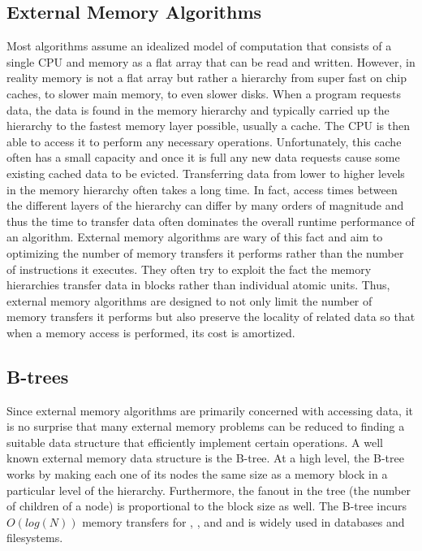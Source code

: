 \documentclass{style}
\begin{document}
\subsection{External Memory Algorithms}


Most algorithms assume an idealized model of computation that consists of a
single CPU and memory as a flat array
that can be read and written. However, in reality memory is not a flat array
but rather a hierarchy from super fast on chip caches, to slower main memory,
to even slower disks. When a program requests data, the data is found in the
memory hierarchy and typically carried up the hierarchy to the fastest memory
layer possible, usually a cache. The CPU is then able to access it to perform
any necessary operations. Unfortunately, this cache often has a small capacity
and once it is full any new data requests cause some existing cached data to
be evicted. Transferring data from lower to higher levels in the memory
hierarchy often takes a long time. In fact, access times between the different
layers of the hierarchy can differ by many orders of magnitude and thus the
time to transfer data often dominates the overall runtime performance of an
algorithm. External memory algorithms are wary of this fact and aim to
optimizing the number of memory transfers it performs rather than the number
of instructions it executes. They often try to exploit the fact the memory
hierarchies transfer data in blocks rather than individual atomic units. Thus,
external memory algorithms are designed to not only limit the number of memory
transfers it performs but also preserve the locality of related data so that
when a memory access is performed, its cost is amortized.

\subsection{B-trees}

Since external memory algorithms are primarily concerned with accessing data,
it is no surprise that many external memory problems can be reduced to finding
a suitable data structure that efficiently implement certain operations. A
well known external memory data structure is the B-tree. At a high level, the
B-tree works by making each one of its nodes the same size as a memory block
in a particular level of the hierarchy. Furthermore, the fanout in the tree
(the number of children of a node) is proportional to the block size as well.
The B-tree incurs $O(log(N))$ memory transfers for \Search{}, \Insert{}, and
\Delete{} and is widely used in databases and filesystems.
\end{document}
